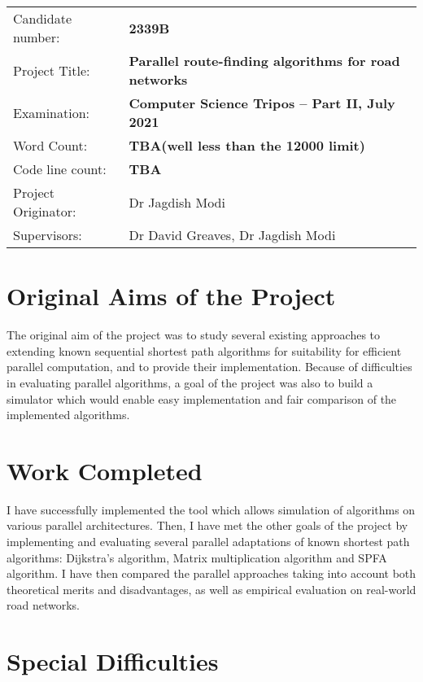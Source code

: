 \documentclass[12pt,a4paper,twoside,openright]{report}
\begin{document}
{\large
\begin{tabular}{ll}
Candidate number:               & \bf 2339B                       \\
Project Title:      & \bf Parallel route-finding algorithms for road networks \\
Examination:        & \bf Computer Science Tripos -- Part II, July 2021  \\
Word Count:         & \bf TBA\footnotemark[1]
                      (well less than the 12000 limit)  \\
Code line count:   & \bf TBA \\                
Project Originator: & Dr Jagdish Modi                    \\
Supervisors:         & Dr David Greaves, Dr Jagdish Modi                     \\ 
\end{tabular}
}


\section*{Original Aims of the Project}

The original aim of the project was to study several existing approaches to extending known sequential shortest path algorithms for suitability for efficient parallel computation, and to provide their implementation. Because of difficulties in evaluating parallel algorithms, a goal of the project was also to build a simulator which would enable easy implementation and fair comparison of the implemented algorithms.

\section*{Work Completed}

I have successfully implemented the tool which allows simulation of algorithms on various parallel architectures. Then, I have met the other goals of the project by implementing and evaluating several parallel adaptations of known shortest path algorithms: Dijkstra's algorithm, Matrix multiplication algorithm and SPFA algorithm. I have then compared the parallel approaches taking into account both theoretical merits and disadvantages, as well as empirical evaluation on real-world road networks.

\section*{Special Difficulties}
\end{document}
